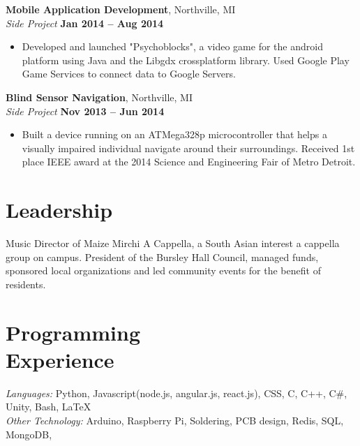 \documentclass[margin,line]{resume}
\begin{document}
\begin{resume}
    \textbf{Mobile Application Development}, Northville, MI \vspace{2mm}\\\vspace{1mm}%
    \textsl{Side Project} \hfill \textbf{Jan 2014 -- Aug 2014}
    \begin{itemize}
    	\item 	Developed and launched "Psychoblocks", a video game for the android platform using Java and the Libgdx cross­platform library. Used Google Play Game Services to connect data to Google Servers.
    \end{itemize}
	
    \textbf{Blind Sensor Navigation}, Northville, MI \vspace{2mm}\\\vspace{1mm}%
	\textsl{Side Project} \hfill \textbf{Nov 2013 -- Jun 2014}
	\begin{itemize}
		\item Built a device running on an ATMega328p micro­controller that helps a visually impaired individual navigate around their surroundings. Received 1st place IEEE award at the 2014 Science and Engineering Fair of Metro Detroit. 
	\end{itemize}
	


   \section{\mysidestyle Leadership}
    Music Director of Maize Mirchi A Cappella, a South Asian interest a cappella group on campus. President of the Bursley Hall Council, managed funds, sponsored local organizations and led community events for the benefit of residents. 
\vspace{-2mm}

    \section{\mysidestyle Programming\\Experience}

    \emph{Languages:} Python, Javascript(node.js, angular.js, react.js), CSS, C,  C++, C\#, Unity, Bash, \LaTeX \\
    \emph{Other Technology:}  Arduino, Raspberry Pi, Soldering, PCB design, Redis, SQL, MongoDB,
\end{resume}
\end{document}
